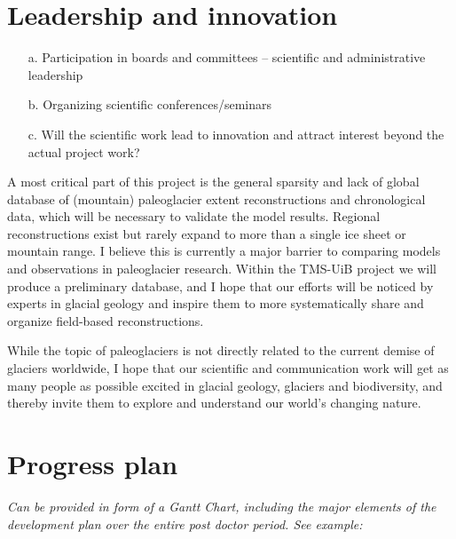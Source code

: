 \documentclass{article}
\newcommand{\guideline}[1]{{\color{color2}\itshape{#1}}}
\begin{document}
\section{Leadership and innovation}

    \guideline{
        \begin{itemize}
          \item[a.] Participation in boards and committees – scientific and
            administrative leadership
          \item[b.] Organizing scientific conferences/seminars
          \item[c.] Will the scientific work lead to innovation and attract
            interest beyond the actual project work?
        \end{itemize}}

    A most critical part of this project is the general sparsity and lack of
    global database of (mountain) paleoglacier extent reconstructions and
    chronological data, which will be
    necessary to validate the model results. Regional reconstructions exist but
    rarely expand to more than a single ice sheet or mountain range. I believe
    this is currently a major barrier to comparing models and observations in
    paleoglacier research. Within the TMS-UiB project we will produce a
    preliminary database, and I hope that our efforts will be noticed by
    experts in glacial geology and inspire them to more systematically share
    and organize field-based reconstructions.

    While the topic of paleoglaciers is not directly related to the current
    demise of glaciers worldwide, I hope that our scientific and communication
    work will get as many people
    as possible excited in glacial geology, glaciers and biodiversity, and
    thereby invite them to explore and understand our world's changing nature.


\section{Progress plan}

    \guideline{
        Can be provided in form of a Gantt Chart, including the major elements
        of the development plan over the entire post doctor period. See
        example:}
\end{document}
